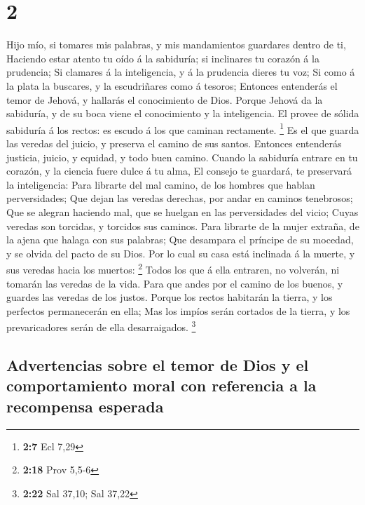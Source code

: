 \hypertarget{section-1}{%
\section{2}\label{section-1}}

 Hijo mío, si tomares mis palabras, y mis mandamientos
guardares dentro de ti,  Haciendo estar atento tu oído á la
sabiduría; si inclinares tu corazón á la prudencia;  Si
clamares á la inteligencia, y á la prudencia dieres tu voz; 
Si como á la plata la buscares, y la escudriñares como á tesoros;
 Entonces entenderás el temor de Jehová, y hallarás el
conocimiento de Dios.  Porque Jehová da la sabiduría, y de
su boca viene el conocimiento y la inteligencia.  El provee
de sólida sabiduría á los rectos: es escudo á los que caminan
rectamente. \footnote{\textbf{2:7} Ecl 7,29}  Es el que
guarda las veredas del juicio, y preserva el camino de sus santos.
 Entonces entenderás justicia, juicio, y equidad, y todo
buen camino.  Cuando la sabiduría entrare en tu corazón, y
la ciencia fuere dulce á tu alma,  El consejo te guardará,
te preservará la inteligencia:  Para librarte del mal
camino, de los hombres que hablan perversidades;  Que dejan
las veredas derechas, por andar en caminos tenebrosos;  Que
se alegran haciendo mal, que se huelgan en las perversidades del vicio;
 Cuyas veredas son torcidas, y torcidos sus caminos.
 Para librarte de la mujer extraña, de la ajena que halaga
con sus palabras;  Que desampara el príncipe de su mocedad,
y se olvida del pacto de su Dios.  Por lo cual su casa está
inclinada á la muerte, y sus veredas hacia los muertos: \footnote{\textbf{2:18}
  Prov 5,5-6}  Todos los que á ella entraren, no volverán,
ni tomarán las veredas de la vida.  Para que andes por el
camino de los buenos, y guardes las veredas de los justos. 
Porque los rectos habitarán la tierra, y los perfectos permanecerán en
ella;  Mas los impíos serán cortados de la tierra, y los
prevaricadores serán de ella desarraigados. \footnote{\textbf{2:22} Sal
  37,10; Sal 37,22}

\hypertarget{advertencias-sobre-el-temor-de-dios-y-el-comportamiento-moral-con-referencia-a-la-recompensa-esperada}{%
\subsection{Advertencias sobre el temor de Dios y el comportamiento
moral con referencia a la recompensa
esperada}\label{advertencias-sobre-el-temor-de-dios-y-el-comportamiento-moral-con-referencia-a-la-recompensa-esperada}}

